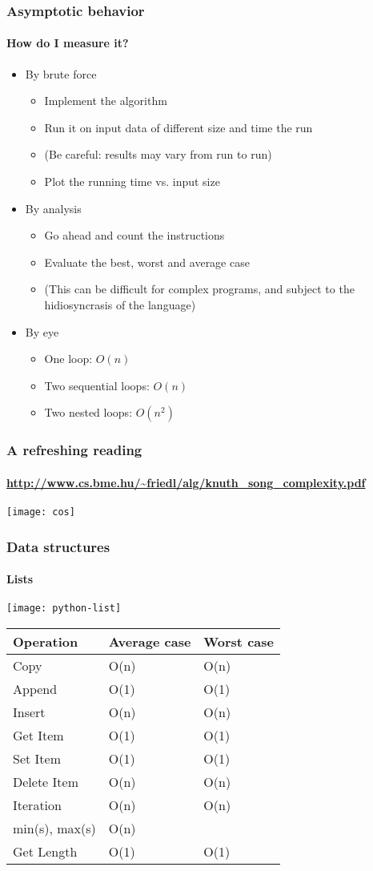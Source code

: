 \documentclass[9pt]{beamer}
\begin{document}
\begin{frame}
  \frametitle{Asymptotic behavior}
  \framesubtitle{How do I measure it?}
  \begin{itemize}
  \item By brute force
    \begin{itemize}
    \item Implement the algorithm
    \item Run it on input data of different size and time the run
    \item (Be careful: results may vary from run to run)
    \item Plot the running time vs. input size
    \end{itemize}
  \item By analysis
    \begin{itemize}
    \item Go ahead and count the instructions
    \item Evaluate the best, worst and average case
    \item (This can be difficult for complex programs, and subject to the
      hidiosyncrasis of the language)
    \end{itemize}
  \item By eye
    \begin{itemize}
    \item One loop: $O(n)$
    \item Two sequential loops: $O(n)$
    \item Two nested loops: $O(n^2)$
    \end{itemize}
  \end{itemize}
\end{frame}


\begin{frame}
  \frametitle{A refreshing reading}
  \framesubtitle{\url{http://www.cs.bme.hu/~friedl/alg/knuth_song_complexity.pdf}}
  \centering\texttt{[image: cos]}
\end{frame}


\begin{frame}
  \frametitle{Data structures}
  \framesubtitle{Lists}
  \centering\texttt{[image: python-list]}

  \bigskip

  \begin{tabular}{lll}
    \hline
    Operation & Average case & Worst case\\
    \hline
    \hline
    Copy & O(n) & O(n)\\
    Append & O(1) & O(1)\\
    Insert & O(n) & O(n)\\
    Get Item & O(1) & O(1)\\
    Set Item & O(1) & O(1)\\
    Delete Item & O(n) & O(n)\\
    Iteration & O(n) & O(n)\\
    min(s), max(s) & O(n) & \\
    Get Length & O(1) & O(1)\\
    \hline
  \end{tabular}
\end{frame}
\end{document}
